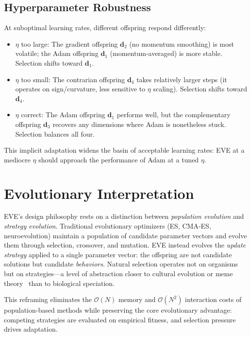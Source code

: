 \documentclass[12pt]{article}
\begin{document}
\subsection{Hyperparameter Robustness}

At suboptimal learning rates, different offspring respond differently:
\begin{itemize}[leftmargin=1.6em, itemsep=3pt]
  \item $\eta$ too large: The gradient offspring $\mathbf{d}_2$
    (no momentum smoothing) is most volatile; the Adam offspring
    $\mathbf{d}_1$ (momentum-averaged) is more stable.
    Selection shifts toward $\mathbf{d}_1$.
  \item $\eta$ too small: The contrarian offspring $\mathbf{d}_4$
    takes relatively larger steps (it operates on sign/curvature,
    less sensitive to $\eta$ scaling).
    Selection shifts toward $\mathbf{d}_4$.
  \item $\eta$ correct: The Adam offspring $\mathbf{d}_1$ performs
    well, but the complementary offspring $\mathbf{d}_3$ recovers
    any dimensions where Adam is nonetheless stuck.
    Selection balances all four.
\end{itemize}

This implicit adaptation widens the basin of acceptable learning rates:
EVE at a mediocre $\eta$ should approach the performance of Adam at
a tuned $\eta$.


\section{Evolutionary Interpretation}
\label{sec:evolutionary}

EVE's design philosophy rests on a distinction between
\emph{population evolution} and \emph{strategy evolution}.
Traditional evolutionary optimizers (ES, CMA-ES, neuroevolution)
maintain a population of candidate parameter vectors and evolve them
through selection, crossover, and mutation.
EVE instead evolves the \emph{update strategy} applied to a single
parameter vector: the offspring are not candidate solutions but
candidate \emph{behaviors}.
Natural selection operates not on organisms but on strategies---a
level of abstraction closer to cultural evolution or
meme theory~\cite{dawkins1976selfish} than to biological speciation.

This reframing eliminates the $\mathcal{O}(N)$ memory and
$\mathcal{O}(N^2)$ interaction costs of population-based methods
while preserving the core evolutionary advantage: competing strategies
are evaluated on empirical fitness, and selection pressure drives
adaptation.
\end{document}
